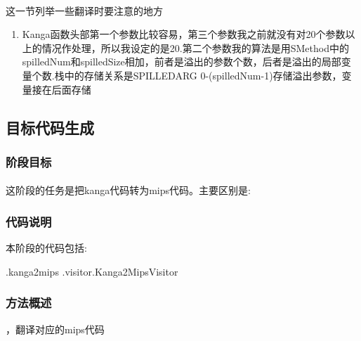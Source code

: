 \documentclass[11pt, oneside]{article}   	%
\begin{document}
\begin{spacing}{1.55}
    \paragraph{}
    这一节列举一些翻译时要注意的地方
    \begin{enumerate}
    ，要把s0,s1...s7压栈保存
    ，可以用v0,v1进行中转
    \item Kanga函数头部第一个参数比较容易，第三个参数我之前就没有对20个参数以上的情况作处理，所以我设定的是20.第二个参数我的算法是用SMethod中的spilledNum和spilledSize相加，前者是溢出的参数个数，后者是溢出的局部变量个数.栈中的存储关系是SPILLEDARG 0-(spilledNum-1)存储溢出参数，变量接在后面存储
    \end{enumerate}
    \subsection{目标代码生成}
    \subsubsection{阶段目标}
    \paragraph{}
    这阶段的任务是把kanga代码转为mips代码。主要区别是:
    \begin{enumerate}
    \end{enumerate}
    \subsubsection{代码说明}
    本阶段的代码包括:
    \begin{enumerate}
    .kanga2mips
    .visitor.Kanga2MipsVisitor
    \end{enumerate}
    \subsubsection{方法概述}
    \begin{enumerate}
    ，翻译对应的mips代码
    \end{enumerate}

\end{spacing}
\end{document}
